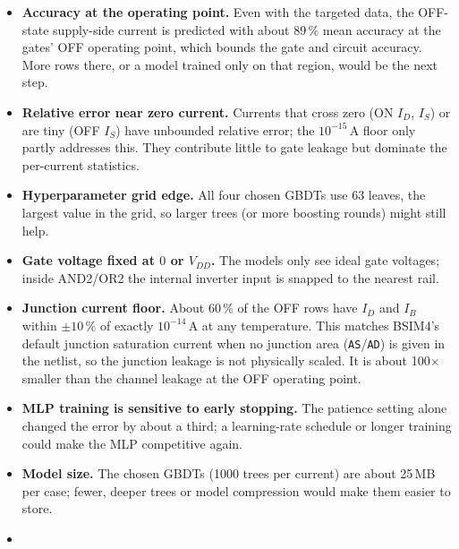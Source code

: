 \begin{itemize}
  \item \textbf{Accuracy at the operating point.} Even with the targeted data, the OFF-state
        supply-side current is predicted with about 89\,\% mean accuracy at the gates' OFF
        operating point, which bounds the gate and circuit accuracy. More rows there, or a
        model trained only on that region, would be the next step.
  \item \textbf{Relative error near zero current.} Currents that cross zero (ON $I_D$, $I_S$)
        or are tiny (OFF $I_S$) have unbounded relative error; the $10^{-15}$\,A floor only
        partly addresses this. They contribute little to gate leakage but dominate the
        per-current statistics.
  \item \textbf{Hyperparameter grid edge.} All four chosen GBDTs use 63 leaves, the largest value
        in the grid, so larger trees (or more boosting rounds) might still help.
  \item \textbf{Gate voltage fixed at $0$ or $V_{DD}$.} The models only see ideal gate
        voltages; inside AND2/OR2 the internal inverter input is snapped to the nearest rail.
  \item \textbf{Junction current floor.} About 60\,\% of the OFF rows have $I_D$ and $I_B$
        within $\pm10\,\%$ of exactly $10^{-14}$\,A at any temperature. This matches BSIM4's
        default junction saturation current when no junction area (\texttt{AS}/\texttt{AD}) is
        given in the netlist, so the junction leakage is not physically scaled. It is about
        100$\times$ smaller than the channel leakage at the OFF operating point.
  \item \textbf{MLP training is sensitive to early stopping.} The patience setting alone
        changed the error by about a third; a learning-rate schedule or longer training could
        make the MLP competitive again.
  \item \textbf{Model size.} The chosen GBDTs (1000 trees per current) are about 25\,MB per
        case; fewer, deeper trees or model compression would make them easier to store.
  \item {}
\end{itemize}
